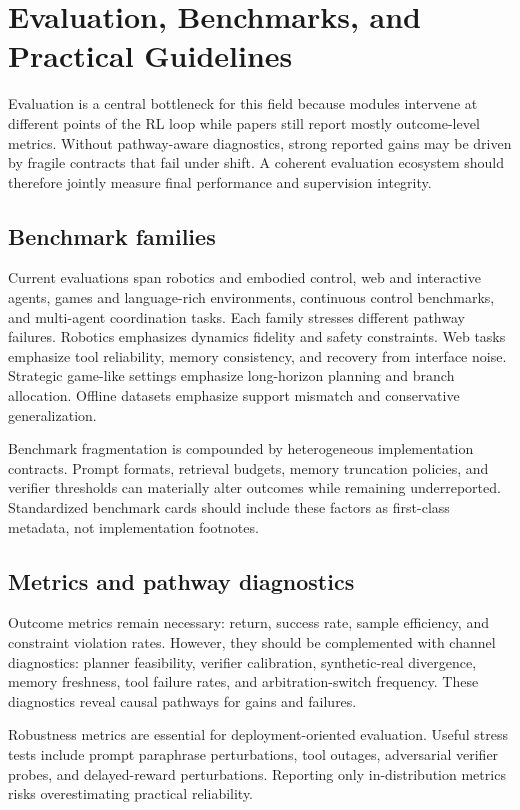 \documentclass[pdflatex,sn-mathphys-num]{sn-jnl}
\begin{document}
\section{Evaluation, Benchmarks, and Practical Guidelines}
Evaluation is a central bottleneck for this field because modules intervene at different points of the RL loop while papers still report mostly outcome-level metrics. Without pathway-aware diagnostics, strong reported gains may be driven by fragile contracts that fail under shift. A coherent evaluation ecosystem should therefore jointly measure final performance and supervision integrity.

\subsection{Benchmark families}
Current evaluations span robotics and embodied control, web and interactive agents, games and language-rich environments, continuous control benchmarks, and multi-agent coordination tasks. Each family stresses different pathway failures. Robotics emphasizes dynamics fidelity and safety constraints. Web tasks emphasize tool reliability, memory consistency, and recovery from interface noise. Strategic game-like settings emphasize long-horizon planning and branch allocation. Offline datasets emphasize support mismatch and conservative generalization.

Benchmark fragmentation is compounded by heterogeneous implementation contracts. Prompt formats, retrieval budgets, memory truncation policies, and verifier thresholds can materially alter outcomes while remaining underreported. Standardized benchmark cards should include these factors as first-class metadata, not implementation footnotes.

\subsection{Metrics and pathway diagnostics}
Outcome metrics remain necessary: return, success rate, sample efficiency, and constraint violation rates. However, they should be complemented with channel diagnostics:
planner feasibility, verifier calibration, synthetic-real divergence, memory freshness, tool failure rates, and arbitration-switch frequency. These diagnostics reveal causal pathways for gains and failures.

Robustness metrics are essential for deployment-oriented evaluation. Useful stress tests include prompt paraphrase perturbations, tool outages, adversarial verifier probes, and delayed-reward perturbations. Reporting only in-distribution metrics risks overestimating practical reliability.
\end{document}
